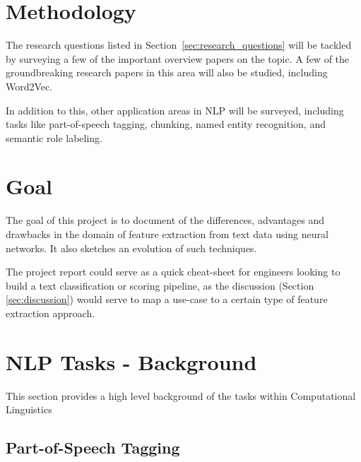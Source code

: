 \documentclass[11pt,a4paper]{article}
\begin{document}

\section{Methodology} %
\label{sec:methodology}

  The research questions listed in Section~\ref{sec:research_questions} will be tackled by surveying a few of the important overview papers on the topic\cite{goldberg2016primer}\cite{bengio2003neural}\cite{morin2005hierarchical}. A few of the groundbreaking research papers in this area will also be studied, including Word2Vec\cite{mikolov2013efficient}\cite{mikolov2013distributed}\cite{mikolov2013linguistic}.

  In addition to this, other application areas in NLP will be surveyed, including tasks like part-of-speech tagging, chunking, named entity recognition, and semantic role labeling. \cite{socher2011parsing}\cite{luong2013better}\cite{maas2015lexicon}\cite{li2015hierarchical}\cite{collobert2011natural}\cite{pennington2014glove}


\section{Goal} %
\label{sec:goal}

  The goal of this project is to document of the differences, advantages and drawbacks in the domain of feature extraction from text data using neural networks. It also sketches an evolution of such techniques.

  The project report could serve as a quick cheat-sheet for engineers looking to build a text classification or scoring pipeline, as the discussion (Section \ref{sec:discussion}) would serve to map a use-case to a certain type of feature extraction approach.



\section{NLP Tasks - Background} %
\label{sec:nlp_tasks_background}

  This section provides a high level background of the tasks within Computational Linguistics

  \subsection{Part-of-Speech Tagging} %
  \label{sub:part_of_speech_tagging}
\end{document}
